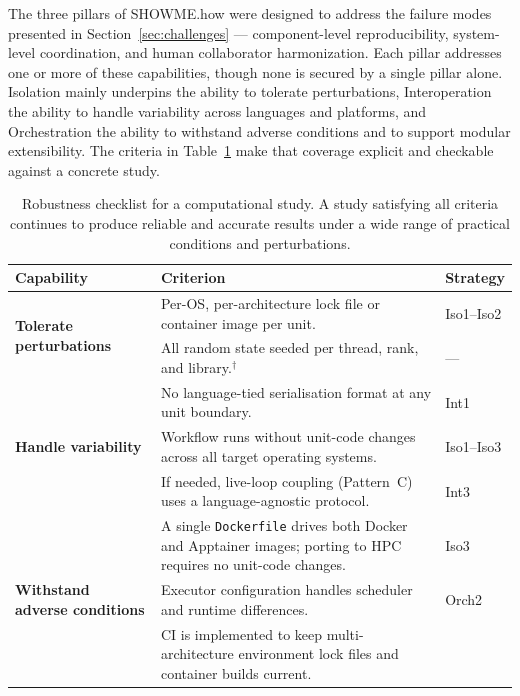 \documentclass{eceasst}
\begin{document}
The three pillars of SHOWME.how were designed to address the failure modes presented in
Section~\ref{sec:challenges} --- component-level reproducibility, system-level coordination, and human collaborator harmonization. Each pillar addresses one or more of these capabilities, though none is secured
by a single pillar alone. Isolation mainly underpins the ability to tolerate
perturbations, Interoperation the ability to handle variability across
languages and platforms, and Orchestration the ability to withstand adverse
conditions and to support modular extensibility. The criteria in Table~\ref{tab:robustness} make that
coverage explicit and checkable against a concrete study.

\begin{table}[htpb]
  \centering
  \small
  \renewcommand{\arraystretch}{1.3}
  \caption{Robustness checklist for a computational study. A study satisfying all
           criteria continues to produce reliable and accurate results under a wide
           range of practical conditions and perturbations.}
  \label{tab:robustness}
  \begin{tabularx}{\linewidth}{p{2.6cm}Xp{2.0cm}}
    \toprule
    \textbf{Capability} & \textbf{Criterion} & \textbf{Strategy} \\
    \midrule
    \multirow{2}{2.6cm}{\textbf{Tolerate perturbations}}
      & Per-OS, per-architecture lock file or container image per unit.
      & Iso1--Iso2 \\
      & All random state seeded per thread, rank, and library.$^\dagger$
      & --- \\
    \midrule
    \multirow{3}{2.6cm}{\textbf{Handle variability}}
      & No language-tied serialisation format at any unit boundary.
      & Int1 \\
      & Workflow runs without unit-code changes across all target operating systems.
      & Iso1--Iso3 \\
      & If needed, live-loop coupling (Pattern~C) uses a language-agnostic protocol.
      & Int3 \\
    \midrule
    \multirow{4}{2.6cm}{\textbf{Withstand adverse conditions}}
      & A single \texttt{Dockerfile} drives both Docker and Apptainer images;
        porting to HPC requires no unit-code changes.
      & Iso3 \\
      & Executor configuration handles scheduler and runtime differences.
      & Orch2 \\
      & CI is implemented to keep multi-architecture environment lock files and container builds current.

\end{tabularx}
\end{table}
\end{document}
